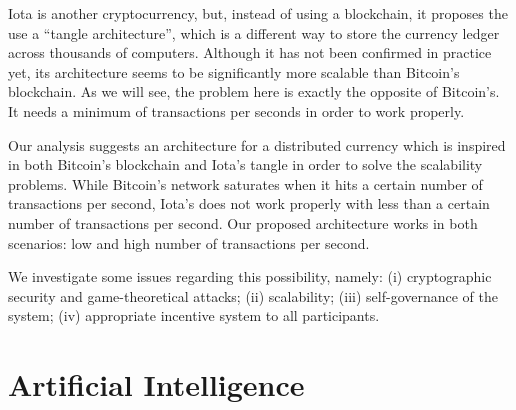 Iota is another cryptocurrency, but, instead of using a blockchain, it proposes the use a ``tangle architecture'', which is a different way to store the currency ledger across thousands of computers. Although it has not been confirmed in practice yet, its architecture seems to be significantly more scalable than Bitcoin's blockchain. As we will see, the problem here is exactly the opposite of Bitcoin's. It needs a minimum of transactions per seconds in order to work properly.

Our analysis suggests an architecture for a distributed currency which is inspired in both Bitcoin's blockchain and Iota's tangle in order to solve the scalability problems. While Bitcoin's network saturates when it hits a certain number of transactions per second, Iota's does not work properly with less than a certain number of transactions per second. Our proposed architecture works in both scenarios: low and high number of transactions per second.

We investigate some issues regarding this possibility, namely: (i) cryptographic security and game-theoretical attacks; (ii) scalability; (iii) self-governance of the system; (iv) appropriate incentive system to all participants.


\section{Artificial Intelligence}

